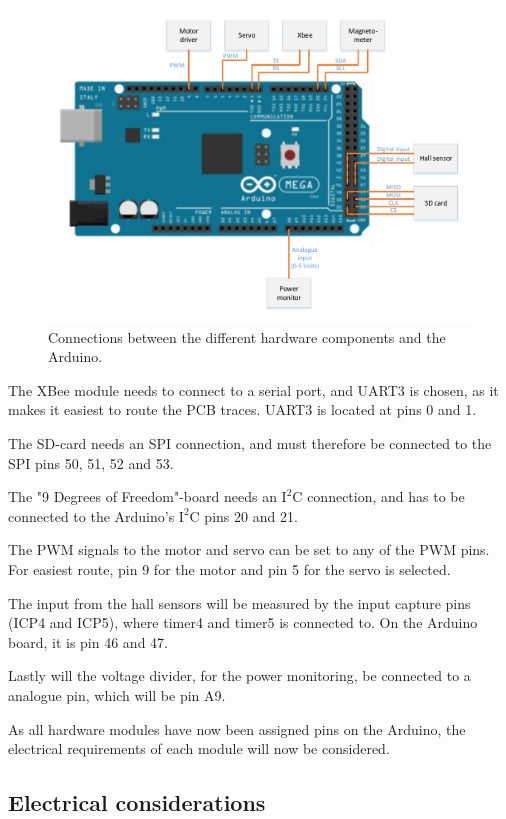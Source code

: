 \begin{figure}[H]
	\centering
	\includegraphics[scale=0.75]{figures/MegaSetup.pdf}
	\caption{Connections between the different hardware components and the Arduino.}
	\label{MegaSetup}
\end{figure}

The XBee module needs to connect to a serial port, and UART3 is chosen, as it makes it easiest to route the PCB traces. UART3 is located at pins 0 and 1. 

The SD-card needs an SPI connection, and must therefore be connected to the SPI pins 50, 51, 52 and 53. 

The "9 Degrees of Freedom"-board needs an $\text{I}^2\text{C}$ connection, and has to be connected to the Arduino's $\text{I}^2\text{C}$ pins 20 and 21. 

The PWM signals to the motor and servo can be set to any of the PWM pins. For easiest route, pin 9 for the motor and pin 5 for the servo is selected.

The input from the hall sensors will be measured by the input capture pins (ICP4 and ICP5), where timer4 and timer5 is connected to. On the Arduino board, it is pin 46 and 47.

Lastly will the voltage divider, for the power monitoring, be connected to a analogue pin, which will be pin A9.


As all hardware modules have now been assigned pins on the Arduino, the electrical requirements of each module will now be considered.

\subsection{Electrical considerations}

